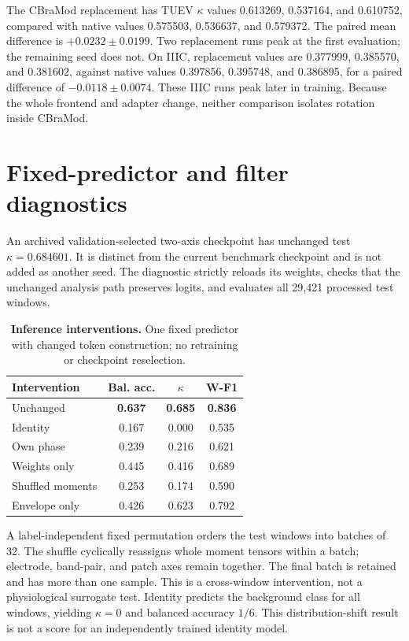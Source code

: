 \documentclass[10pt,twocolumn,letterpaper]{article}
\newcommand{\TableStyle}{\fontsize{8}{9.5}\selectfont\setlength{\tabcolsep}{3pt}\renewcommand{\arraystretch}{1.10}}
\begin{document}
The CBraMod replacement has TUEV $\kappa$ values
0.613269, 0.537164, and 0.610752, compared with native values
0.575503, 0.536637, and 0.579372. The paired mean difference is
$+0.0232\pm0.0199$. Two replacement runs peak at the first evaluation;
the remaining seed does not. On IIIC, replacement values are
0.377999, 0.385570, and 0.381602, against native values
0.397856, 0.395748, and 0.386895, for a paired difference of
$-0.0118\pm0.0074$. These IIIC runs peak later in training.
Because the whole frontend and adapter change, neither comparison
isolates rotation inside CBraMod.

\section{Fixed-predictor and filter diagnostics}
\label{app:diagnostics}
An archived validation-selected two-axis checkpoint has unchanged test
$\kappa=0.684601$. It is distinct from the current benchmark checkpoint
and is not added as another seed. The diagnostic strictly reloads its
weights, checks that the unchanged analysis path preserves logits, and
evaluates all 29,421 processed test windows.

\begin{table}[t]
\centering\TableStyle
\caption{\textbf{Inference interventions.} One fixed predictor with
changed token construction; no retraining or checkpoint reselection.}
\label{tab:interventions}
\begin{tabular*}{\linewidth}{@{\extracolsep{\fill}}lccc@{}}
\toprule
Intervention & Bal. acc. & $\kappa$ & W-F1\\
\midrule
Unchanged & \textbf{0.637} & \textbf{0.685} & \textbf{0.836}\\
Identity & 0.167 & 0.000 & 0.535\\
Own phase & 0.239 & 0.216 & 0.621\\
Weights only & 0.445 & 0.416 & 0.689\\
Shuffled moments & 0.253 & 0.174 & 0.590\\
Envelope only & 0.426 & 0.623 & 0.792\\
\bottomrule
\end{tabular*}
\end{table}

A label-independent fixed permutation orders the test windows into
batches of 32. The shuffle cyclically reassigns whole moment tensors
within a batch; electrode, band-pair, and patch axes remain together.
The final batch is retained and has more than one sample. This is a
cross-window intervention, not a physiological surrogate test.
Identity predicts the background class for all windows, yielding
$\kappa=0$ and balanced accuracy $1/6$. This distribution-shift result
is not a score for an independently trained identity model.
\end{document}
